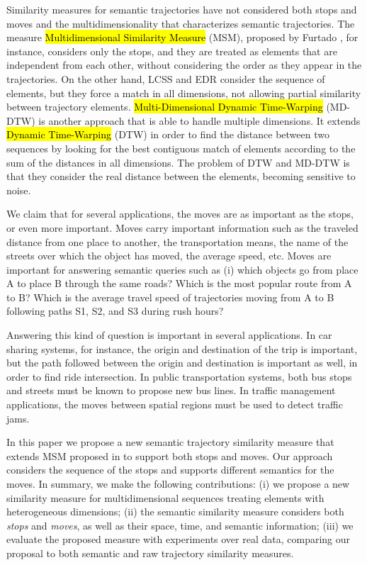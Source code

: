 \documentclass[12pt]{article}
\begin{document}
Similarity measures for semantic trajectories have not considered both stops and moves and the multidimensionality that characterizes semantic trajectories. The measure \hl{Multidimensional Similarity Measure} (MSM), proposed by Furtado \cite{Furtado:TGIS12156}, for instance, considers only the stops, and they are treated as elements that are independent from each other, without considering the order as they appear in the trajectories. On the other hand, LCSS\cite{vlachos2002discovering} and EDR\cite{Chen:2005:RFS:1066157.1066213} consider the sequence of elements, but they force a match in all dimensions, not allowing partial similarity between trajectory elements. \hl{Multi-Dimensional Dynamic Time-Warping} (MD-DTW) \cite{ten2007multi} is another approach that is able to handle multiple dimensions. It extends \hl{Dynamic Time-Warping} (DTW) \cite{berndt1994using} in order to find the distance between two sequences by looking for the best contiguous match of elements according to the sum of the distances in all dimensions. The problem of DTW and MD-DTW is that they consider the real distance between the elements, becoming sensitive to noise.

\hl{}
We claim that for several applications, the moves are as important as the stops, or even more important. Moves carry important information such as the traveled distance from one place to another, the transportation means, the name of the streets over which the object has moved, the average speed, etc. Moves are important for answering semantic queries such as (i) which objects go from place A to place B through the same roads? Which is the most popular route from A to B? Which is the average travel speed of trajectories moving from A to B following paths S1, S2, and S3 during rush hours?

Answering this kind of question is important in several applications. In car sharing systems, for instance, the origin and destination of the trip is important, but the path followed between the origin and destination is important as well, in order to find ride intersection. In public transportation systems, both bus stops and streets must be known to propose new bus lines. In traffic management applications, the moves between spatial regions must be used to detect traffic jams.

In this paper we propose a new semantic trajectory similarity measure that extends MSM proposed in \cite{Furtado:TGIS12156} to support both stops and moves. Our approach considers the sequence of the stops and supports different semantics for the moves. 
In summary, we make the following contributions:
(i) we propose a new similarity measure for multidimensional sequences treating elements with heterogeneous dimensions; (ii) the semantic similarity measure considers both \textit{stops} and \textit{moves}, as well as their space, time, and semantic information; (iii) we evaluate the proposed measure with experiments over real data, comparing our proposal to both semantic and raw trajectory similarity measures.
\end{document}
